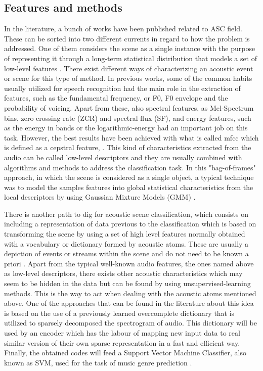 \subsection{Features and methods}
	
	In the literature, a bunch of works have been published related to ASC field. These can be sorted into two different currents in regard to how the problem is addressed. One of them considers the scene as a single instance with the purpose of representing it through a long-term statistical distribution that models a set of low-level features \cite{Stowell2015}. There exist different ways of characterizing an acoustic event or scene for this type of method. In previous works, some of the common habits usually utilized for speech recognition had the main role in the extraction of features, such as the fundamental frequency, or F0, F0 envelope and the probability of voicing. Apart from these, also spectral features, as Mel-Spectrum bins, zero crossing rate (ZCR) and spectral flux (SF), and energy features, such as the energy in bands or the logarithmic-energy \cite{Geiger2013} had an important job on this task. However, the best results have been achieved with what is called \gls{mfcc}  which is defined as a cepstral feature, \textbf{\color{red}{which will be explained further on}}. This kind of characteristics extracted from the audio can be called low-level descriptors and they are usually combined with algorithms and methods to address the classification task. In this "bag-of-frames" approach, in which the scene is considered as a single object, a typical technique was to model the samples features into global statistical characteristics from the local descriptors by using Gaussian Mixture Models (GMM) \cite{Aucouturier2007}.
	
	There is another path to dig for acoustic scene classification, which consists on including a representation of data previous to the classification which is based on transforming the scene by using a set of high level features normally obtained with a vocabulary or dictionary formed by acoustic atoms. These are usually a depiction of events or streams within the scene and do not need to be known a priori \cite{Stowell2015}. Apart from the typical well-known audio features, the ones named above as low-level descriptors, there exists other acoustic characteristics which may seem to be hidden in the data but can be found by using unsupervised-learning methods. This is the way to act when dealing with the acoustic atoms mentioned above. 
	One of the approaches that can be found in the literature about this idea is based on the use of a previously learned overcomplete dictionary that is utilized to sparsely decomposed the spectrogram of audio. This dictionary will be used by an encoder which has the labour of mapping new input data to real similar version of their own sparse representation in a fast and efficient way. Finally, the obtained codes will feed a Support Vector Machine Classifier, also known as SVM, used for the task of music genre prediction \cite{Henaff2011}. 
	

